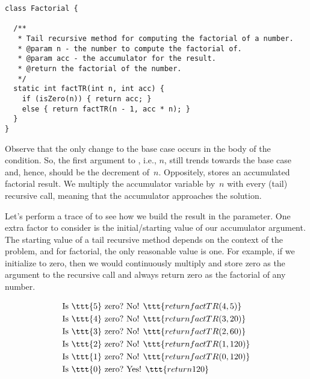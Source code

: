 \begin{lstlisting}[language=MyJava]
class Factorial {

  /**
   * Tail recursive method for computing the factorial of a number.
   * @param n - the number to compute the factorial of.
   * @param acc - the accumulator for the result.
   * @return the factorial of the number.
   */
  static int factTR(int n, int acc) {
    if (isZero(n)) { return acc; } 
    else { return factTR(n - 1, acc * n); }
  }
}
\end{lstlisting}

Observe that the only change to the base case occurs in the body of the condition. 
So, the first argument to , i.e., $n$, still trends towards the base case and, hence, should be the decrement of~$n$. 
Oppositely,  stores an accumulated factorial result. 
We multiply the accumulator variable by~$n$ with every (tail) recursive call, meaning that the accumulator approaches the solution.

Let's perform a trace of  to see how we build the result in the  parameter. 
One extra factor to consider is the initial/starting value of our accumulator argument. 
The starting value of a tail recursive method depends on the context of the problem, and for factorial, the only reasonable value is one. 
For example, if we initialize  to zero, then we would continuously multiply and store zero as the argument to the recursive call and always return zero as the factorial of any number.

\begin{align*}
    \text{Is }\ttt{5} \text{ zero?} &\text{ No! }\ttt{return factTR(4, 5)}\\
    \text{Is }\ttt{4} \text{ zero?} &\text{ No! }\ttt{return factTR(3, 20)}\\
    \text{Is }\ttt{3} \text{ zero?} &\text{ No! }\ttt{return factTR(2, 60)}\\
    \text{Is }\ttt{2} \text{ zero?} &\text{ No! }\ttt{return factTR(1, 120)}\\
    \text{Is }\ttt{1} \text{ zero?} &\text{ No! }\ttt{return factTR(0, 120)}\\
    \text{Is }\ttt{0} \text{ zero?} &\text{ Yes! }\ttt{return 120}
\end{align*}


